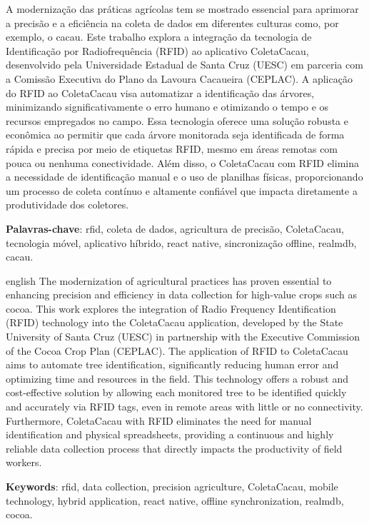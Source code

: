 
\setlength{\absparsep}{18pt}
\begin{resumo}
    A modernização das práticas agrícolas tem se mostrado essencial para aprimorar a precisão e a eficiência na coleta de dados em diferentes culturas como, por exemplo, o cacau. Este trabalho explora a integração da tecnologia de Identificação por Radiofrequência (RFID) ao aplicativo ColetaCacau, desenvolvido pela Universidade Estadual de Santa Cruz (UESC) em parceria com a Comissão Executiva do Plano da Lavoura Cacaueira (CEPLAC). A aplicação do RFID ao ColetaCacau visa automatizar a identificação das árvores, minimizando significativamente o erro humano e otimizando o tempo e os recursos empregados no campo. Essa tecnologia oferece uma solução robusta e econômica ao permitir que cada árvore monitorada seja identificada de forma rápida e precisa por meio de etiquetas RFID, mesmo em áreas remotas com pouca ou nenhuma conectividade. Além disso, o ColetaCacau com RFID elimina a necessidade de identificação manual e o uso de planilhas físicas, proporcionando um processo de coleta contínuo e altamente confiável que impacta diretamente a produtividade dos coletores.
    \vspace{\onelineskip}
    
    \noindent 
    \textbf{Palavras-chave}: rfid, coleta de dados, agricultura de precisão, ColetaCacau, tecnologia móvel, aplicativo híbrido, react native, sincronização offline, realmdb, cacau.
\end{resumo}

\begin{resumo}[Abstract]
 \begin{otherlanguage*}{english}
     The modernization of agricultural practices has proven essential to enhancing precision and efficiency in data collection for high-value crops such as cocoa. This work explores the integration of Radio Frequency Identification (RFID) technology into the ColetaCacau application, developed by the State University of Santa Cruz (UESC) in partnership with the Executive Commission of the Cocoa Crop Plan (CEPLAC). The application of RFID to ColetaCacau aims to automate tree identification, significantly reducing human error and optimizing time and resources in the field. This technology offers a robust and cost-effective solution by allowing each monitored tree to be identified quickly and accurately via RFID tags, even in remote areas with little or no connectivity. Furthermore, ColetaCacau with RFID eliminates the need for manual identification and physical spreadsheets, providing a continuous and highly reliable data collection process that directly impacts the productivity of field workers.
    \vspace{\onelineskip}
    
    \noindent 
    \textbf{Keywords}: rfid, data collection, precision agriculture, ColetaCacau, mobile technology, hybrid application, react native, offline synchronization, realmdb, cocoa.
 \end{otherlanguage*}
\end{resumo}
